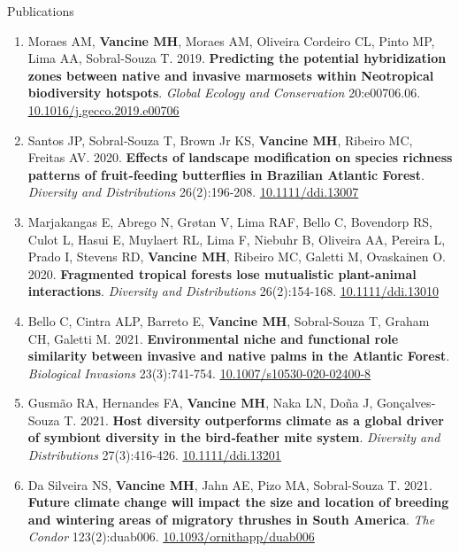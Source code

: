 \documentclass{resume}
\begin{document}
\begin{rSection}{Publications}
\begin{enumerate}
\item Moraes AM, \textbf{Vancine MH}, Moraes AM, Oliveira Cordeiro CL, Pinto MP, Lima AA, Sobral-Souza T. 2019. \textbf{Predicting the potential hybridization zones between native and invasive marmosets within Neotropical biodiversity hotspots}. \textit{Global Ecology and Conservation} 20:e00706.06. \href{https://doi.org/10.1016/j.gecco.2019.e00706}{\underline{10.1016/j.gecco.2019.e00706}}

\item Santos JP, Sobral‐Souza T, Brown Jr KS, \textbf{Vancine MH}, Ribeiro MC, Freitas AV. 2020. \textbf{Effects of landscape modification on species richness patterns of fruit‐feeding butterflies in Brazilian Atlantic Forest}. \textit{Diversity and Distributions} 26(2):196-208. \href{https://doi.org/10.1111/ddi.13007}{\underline{10.1111/ddi.13007}}

\item Marjakangas E, Abrego N, Grøtan V, Lima RAF, Bello C, Bovendorp RS, Culot L, Hasui E, Muylaert RL, Lima F, Niebuhr B, Oliveira AA, Pereira L, Prado I, Stevens RD, \textbf{Vancine MH}, Ribeiro MC, Galetti M, Ovaskainen O. 2020. \textbf{Fragmented tropical forests lose mutualistic plant-animal interactions}. \textit{Diversity and Distributions} 26(2):154-168. \href{https://doi.org/10.1111/ddi.13010}{\underline{10.1111/ddi.13010}}

\item Bello C, Cintra ALP, Barreto E, \textbf{Vancine MH}, Sobral-Souza T, Graham CH, Galetti M. 2021. \textbf{Environmental niche and functional role similarity between invasive and native palms in the Atlantic Forest}. \textit{Biological Invasions} 23(3):741-754. \href{https://doi.org/10.1007/s10530-020-02400-8}{\underline{10.1007/s10530-020-02400-8}}

\item Gusmão RA, Hernandes FA, \textbf{Vancine MH}, Naka LN, Doña J, Gonçalves‐Souza T. 2021. \textbf{Host diversity outperforms climate as a global driver of symbiont diversity in the bird‐feather mite system}. \textit{Diversity and Distributions} 27(3):416-426. \href{https://doi.org/10.1111/ddi.13201}{\underline{10.1111/ddi.13201}}

\item Da Silveira NS, \textbf{Vancine MH}, Jahn AE, Pizo MA, Sobral-Souza T. 2021. \textbf{Future climate change will impact the size and location of breeding and wintering areas of migratory thrushes in South America}. \textit{The Condor} 123(2):duab006. \href{https://doi.org/10.1093/ornithapp/duab006}{\underline{10.1093/ornithapp/duab006}}


\end{enumerate}
\end{rSection}
\end{document}

